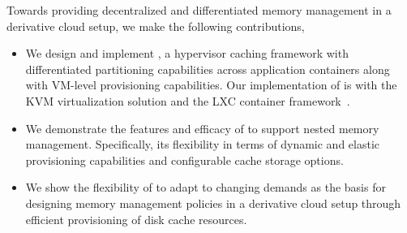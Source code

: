 %


%
%
Towards providing decentralized and differentiated memory management 
in a derivative cloud setup, we make the following contributions,
\begin{itemize}
\item We design and implement \dd, a hypervisor caching framework
with differentiated partitioning capabilities across application
containers along with VM-level provisioning capabilities.
Our implementation of \dd{} is with the KVM virtualization 
solution and the LXC container framework~\cite{lxc}.
\item We demonstrate the features and efficacy of \dd{} to
support nested memory management.
Specifically, its flexibility in terms of dynamic and elastic
provisioning capabilities and configurable cache storage options.
%
\item We show the flexibility of \dd{} to adapt to changing demands
as the basis for designing memory management
policies in a derivative cloud setup through efficient provisioning of disk cache
resources.
%
\end{itemize}  
%
%
